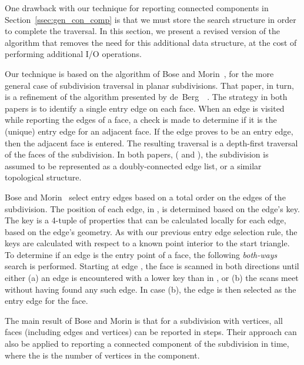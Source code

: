   One drawback with our technique for reporting connected components 
  in Section~\ref{ssec:gen_con_comp} is that 
  we must store the search structure  in order to complete the 
  traversal. 
  In this section, we present a revised version of the algorithm that removes 
  the need for this additional data structure, at the cost of performing 
  additional I/O operations.

  Our technique is based on the algorithm of Bose and 
  Morin~\cite{DBLP:conf/isaac/BoseM00}, for the more general case of subdivision 
  traversal in planar subdivisions. 
  That paper, in turn, is a refinement of the algorithm presented by 
  de~Berg~\etal~\cite{DBLP:journals/gis/BergKOO97}. 
  The strategy in both papers is to identify a single entry edge on each face. 
  When an edge is visited while reporting the edges of a face, a check is made 
  to determine if it is the (unique) entry edge for an adjacent face. 
  If the edge proves to be an entry edge, then the adjacent face is entered. 
  The resulting traversal is a depth-first traversal of the faces of the 
  subdivision. 
  In both papers, (\cite{DBLP:conf/isaac/BoseM00} and \cite{DBLP:journals/gis/BergKOO97}),
  the subdivision is assumed 
  to be represented as a doubly-connected edge list, or a similar 
  topological structure. 

  Bose and Morin~\cite{DBLP:conf/isaac/BoseM00} select entry edges based 
  on a total order  on the edges of the subdivision. 
  The position of each edge,  in , is determined based on 
  the edge's key. 
  The key is a 4-tuple of properties that can be calculated locally for 
  each edge, based on the edge's geometry. 
  As with our previous entry edge selection rule, the keys are calculated 
  with respect to a known point interior to the start triangle.
  To determine if an edge is the entry point of a face, the following 
  \emph{both-ways} search is performed.
  Starting at edge , the face is scanned in both directions 
  until either (a) an edge  is encountered with 
  a lower key than  in , or (b) the scans meet without 
  having found any such edge.  
  In case (b), the edge  is then selected as the entry edge for 
  the face.

  The main result of Bose and Morin is that for a subdivision 
  with  vertices, all faces (including edges and vertices) can be 
  reported in  steps. 
  Their approach can also be applied to reporting a connected 
  component of the subdivision in  time, where the 
   is the number of vertices in the component.  

